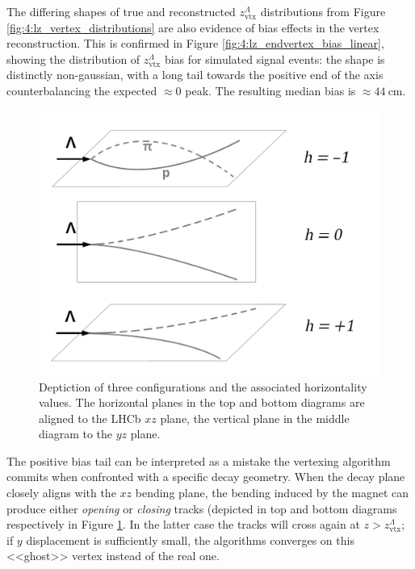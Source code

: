 The differing shapes of true and reconstructed $z_\text{vtx}^\Lambda$ distributions from Figure \ref{fig:4:lz_vertex_distributions} are also evidence of bias effects in the \lambdadecay vertex reconstruction.
This is confirmed in Figure \ref{fig:4:lz_endvertex_bias_linear}, showing the distribution of $z_\text{vtx}^\Lambda$ bias for simulated signal events:
the shape is distinctly non-gaussian, with a long tail towards the positive end of the axis counterbalancing the expected $\approx 0$ peak.
The resulting median bias is $\approx \SI{44}{\centi\meter}$.

\begin{figure}[t]
	\centering
	\includegraphics[width=.7\textwidth]{graphics/04-event_selection/horizontality_illustration_bw.png}
	\caption{Deptiction of three \lambdadecay configurations and the associated horizontality values. The horizontal planes in the top and bottom diagrams are aligned to the LHCb $xz$ plane, the vertical plane in the middle diagram to the $yz$ plane.}
	\label{fig:4:horizontality_explanation}
\end{figure}

The positive bias tail can be interpreted as a mistake the vertexing algorithm commits when confronted with a specific decay geometry.
When the \lambdadecay decay plane closely aligns with the $xz$ bending plane, the bending induced by the magnet can produce either \textit{opening} or \textit{closing} tracks (depicted in top and bottom diagrams respectively in Figure \ref{fig:4:horizontality_explanation}.
In the latter case the tracks will cross again at $z>z_\text{vtx}^\Lambda$;
if $y$ displacement is sufficiently small, the algorithms converges on this <<ghost>> vertex instead of the real one.

